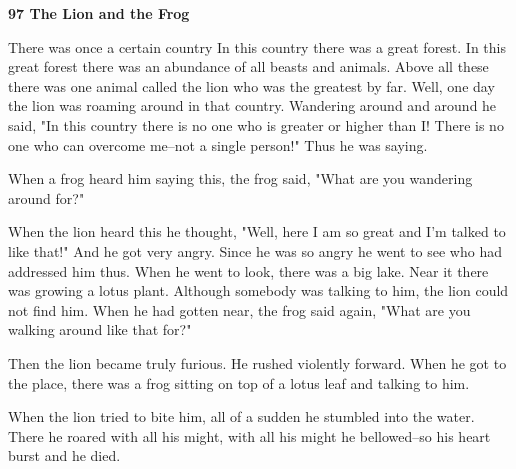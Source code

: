 
\textbf{97 The Lion and the Frog}

There was once a certain country In this country there was a great forest. In this
great forest there was an abundance of all beasts and animals. Above all these
there was one animal called the lion who was the greatest by far. Well, one day
the lion was roaming around in that country. Wandering around and around he said,
"In this country there is no one who is greater or higher than I! There
is no one who can overcome me--not a single person!" Thus he was saying.

When a frog heard him saying this, the frog said, "What are you wandering
around for?"

When the lion heard this he thought, "Well, here I am so great and I'm
talked to like that!" And he got very angry. Since he was so angry he
went to see who had addressed him thus. When he went to look, there was a big lake.
Near it there was growing a lotus plant. Although somebody was talking to him,
the lion could not find him. When he had gotten near, the frog said again, "What
are you walking around like that for?"

Then the lion became truly furious. He rushed violently forward. When he got to
the place, there was a frog sitting on top of a lotus leaf and talking to him.

When the lion tried to bite him, all of a sudden he stumbled into the water. There
he roared with all his might, with all his might he bellowed--so his heart burst
and he died.


